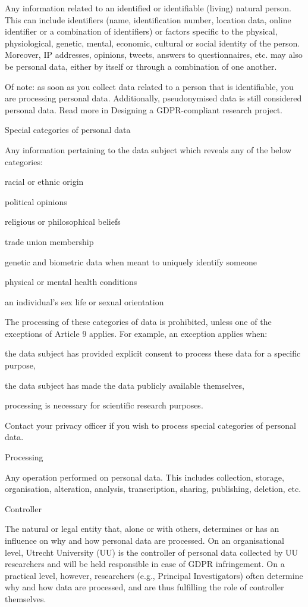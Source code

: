 \documentclass[
]{book}
\begin{document}
Any information related to an identified or identifiable (living) natural
person. This can include identifiers (name, identification number, location
data, online identifier or a combination of identifiers) or factors specific
to the physical, physiological, genetic, mental, economic, cultural or social
identity of the person. Moreover, IP addresses, opinions, tweets, answers to
questionnaires, etc. may also be personal data, either by itself or through a
combination of one another.

Of note: as soon as you collect data related to a person that is identifiable,
you are processing personal data. Additionally, pseudonymised data is still
considered personal data. Read more in
Designing a GDPR-compliant research project.

Special categories of personal data

Any information pertaining to the data subject which reveals any of the below categories:

racial or ethnic origin

political opinions

religious or philosophical beliefs

trade union membership

genetic and biometric data when meant to uniquely identify someone

physical or mental health conditions

an individual's sex life or sexual orientation

The processing of these categories of data is prohibited, unless one of
the exceptions of Article 9
applies. For example, an exception applies when:

the data subject has provided explicit consent to process these data for
a specific purpose,

the data subject has made the data publicly available themselves,

processing is necessary for scientific research purposes.

Contact your privacy
officer if you wish to process special categories of personal data.

Processing

Any operation performed on personal data. This includes collection, storage,
organisation, alteration, analysis, transcription, sharing, publishing, deletion, etc.

Controller

The natural or legal entity that, alone or with others, determines or has an
influence on why and how personal data are processed. On an
organisational level, Utrecht University (UU) is the controller of personal
data collected by UU researchers and will be held responsible in case of GDPR
infringement. On a practical level, however, researchers (e.g., Principal
Investigators) often determine why and how data are processed, and are thus
fulfilling the role of controller themselves.
\end{document}
